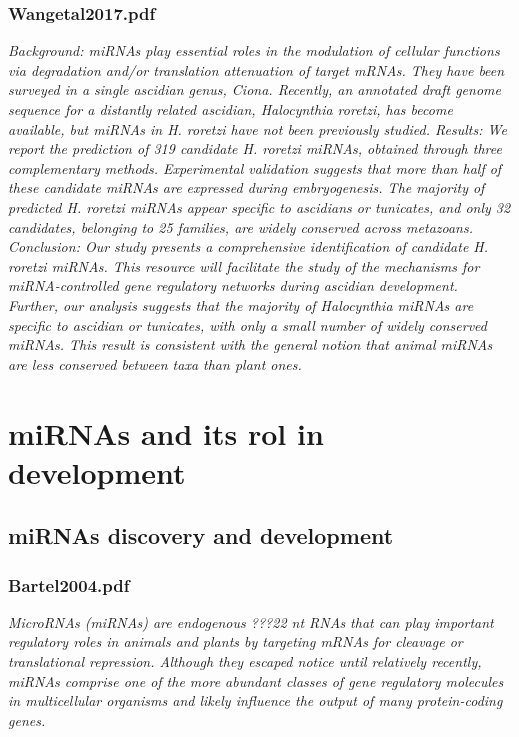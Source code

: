 \documentclass[graybox]{svmult}
\begin{document}
\subsubsection{Wangetal2017.pdf}
\cite{Wang2017}
\textit{Background: miRNAs play essential roles in the modulation of cellular functions via degradation and/or translation
attenuation of target mRNAs. They have been surveyed in a single ascidian genus, Ciona. Recently, an annotated
draft genome sequence for a distantly related ascidian, Halocynthia roretzi, has become available, but miRNAs in
H. roretzi have not been previously studied.
Results: We report the prediction of 319 candidate H. roretzi miRNAs, obtained through three complementary
methods. Experimental validation suggests that more than half of these candidate miRNAs are expressed during
embryogenesis. The majority of predicted H. roretzi miRNAs appear specific to ascidians or tunicates, and only 32
candidates, belonging to 25 families, are widely conserved across metazoans.
Conclusion: Our study presents a comprehensive identification of candidate H. roretzi miRNAs. This resource
will facilitate the study of the mechanisms for miRNA-controlled gene regulatory networks during ascidian
development. Further, our analysis suggests that the majority of Halocynthia miRNAs are specific to ascidian
or tunicates, with only a small number of widely conserved miRNAs. This result is consistent with the general
notion that animal miRNAs are less conserved between taxa than plant ones.}

\section{miRNAs and its rol in development}
\label{sec:3}

\subsection{miRNAs discovery and development}

\subsubsection{Bartel2004.pdf}

\cite{Bartel2004}
\textit{MicroRNAs (miRNAs) are endogenous ???22 nt RNAs that can play important regulatory roles in animals and plants by targeting mRNAs for cleavage or translational repression. Although they escaped notice until relatively recently, miRNAs comprise one of the more abundant classes of gene regulatory molecules in multicellular organisms and likely influence the output of many protein-coding genes.}
\end{document}
